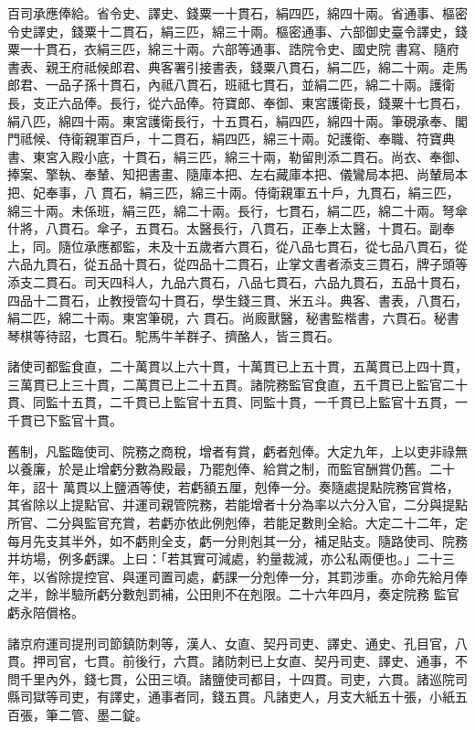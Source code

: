 \begin{pinyinscope}
 百司承應俸給。省令史、譯史、錢粟一十貫石，絹四匹，綿四十兩。省通事、樞密令史譯史，錢粟十二貫石，絹三匹，綿三十兩。樞密通事、六部御史臺令譯史，錢粟一十貫石，衣絹三匹，綿三十兩。六部等通事、誥院令史、國史院
 書寫、隨府書表、親王府祗候郎君、典客署引接書表，錢粟八貫石，絹二匹，綿二十兩。走馬郎君、一品子孫十貫石，內祗八貫石，班祗七貫石，並絹二匹，綿二十兩。護衛長，支正六品俸。長行，從六品俸。符寶郎、奉御、東宮護衛長，錢粟十七貫石，絹八匹，綿四十兩。東宮護衛長行，十五貫石，絹四匹，綿四十兩。筆硯承奉、閣門祗候、侍衛親軍百戶，十二貫石，絹四匹，綿三十兩。妃護衛、奉職、符寶典書、東宮入殿小底，十貫石，絹三匹，綿三十兩，勒留則添二貫石。尚衣、奉御、捧案、擎執、奉輦、知把書畫、隨庫本把、左右藏庫本把、儀鸞局本把、尚輦局本把、妃奉事，八
 貫石，絹三匹，綿三十兩。侍衛親軍五十戶，九貫石，絹三匹，綿三十兩。未係班，絹三匹，綿二十兩。長行，七貫石，絹二匹，綿二十兩。弩傘什將，八貫石。傘子，五貫石。太醫長行，八貫石，正奉上太醫，十貫石。副奉上，同。隨位承應都監，未及十五歲者六貫石，從八品七貫石，從七品八貫石，從六品九貫石，從五品十貫石，從四品十二貫石，止掌文書者添支三貫石，牌子頭等添支二貫石。司天四科人，九品六貫石，八品七貫石，六品九貫石，五品十貫石，四品十二貫石，止教授管勾十貫石，學生錢三貫、米五斗。典客、書表，八貫石，絹二匹，綿二十兩。東宮筆硯，六
 貫石。尚廄獸醫，秘書監楷書，六貫石。秘書琴棋等待詔，七貫石。駝馬牛羊群子、擠酪人，皆三貫石。



 諸使司都監食直，二十萬貫以上六十貫，十萬貫已上五十貫，五萬貫已上四十貫，三萬貫已上三十貫，二萬貫已上二十五貫。諸院務監官食直，五千貫已上監官二十貫、同監十五貫，二千貫已上監官十五貫、同監十貫，一千貫已上監官十五貫，一千貫已下監官十貫。



 舊制，凡監臨使司、院務之商稅，增者有賞，虧者剋俸。大定九年，上以吏非祿無以養廉，於是止增虧分數為殿最，乃罷剋俸、給賞之制，而監官酬賞仍舊。二十年，詔十
 萬貫以上鹽酒等使，若虧額五厘，剋俸一分。奏隨處提點院務官賞格，其省除以上提點官、并運司親管院務，若能增者十分為率以六分入官，二分與提點所官、二分與監官充賞，若虧亦依此例剋俸，若能足數則全給。大定二十二年，定每月先支其半外，如不虧則全支，虧一分則剋其一分，補足貼支。隨路使司、院務并坊場，例多虧課。上曰：「若其實可減處，約量裁減，亦公私兩便也。」二十三年，以省除提控官、與運司置司處，虧課一分剋俸一分，其罰涉重。亦命先給月俸之半，餘半驗所虧分數剋罰補，公田則不在剋限。二十六年四月，奏定院務
 監官虧永陪償格。



 諸京府運司提刑司節鎮防刺等，漢人、女直、契丹司吏、譯史、通史、孔目官，八貫。押司官，七貫。前後行，六貫。諸防刺已上女直、契丹司吏、譯史、通事，不問千里內外，錢七貫，公田三頃。諸鹽使司都目，十四貫。司吏，六貫。諸巡院司縣司獄等司吏，有譯史，通事者同，錢五貫。凡諸吏人，月支大紙五十張，小紙五百張，筆二管、墨二錠。




\end{pinyinscope}
